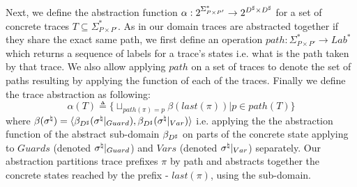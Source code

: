 Next, we define the abstraction function $\alpha : 2^{\Sigma^{*}_{P \times P'}} \rightarrow 2^{D^\sharp \times D^\sharp}$ for a set of concrete traces $T \subseteq \Sigma^{*}_{P \times P'}$. As in our domain traces are abstracted together if they share the exact same path, we first define an operation $path : \Sigma^{*}_{P \times P'} \rightarrow Lab^{*}$ which returns a sequence of labels for a trace's states i.e. what is the path taken by that trace. We also allow applying $path$ on a set of traces to denote the set of paths resulting by applying the function of each of the traces. Finally we define the trace abstraction as following:
\[
\alpha(T) \triangleq \{ \sqcup_{path(\pi)=p} \beta(last(\pi)) | p \in path(T) \}
\]
where $\beta(\sigma^\natural) = \langle \beta_{D^\sharp}(\sigma^\natural|_{Guard}), \beta_{D^\sharp}(\sigma^\natural|_{Var}) \rangle$  i.e. applying the the abstraction function of the abstract sub-domain $\beta_{D^\sharp}$ on parts of the concrete state applying to $Guards$ (denoted $\sigma^\natural|_{Guard}$) and $Vars$ (denoted $\sigma^\natural|_{Var}$) separately. Our abstraction partitions trace prefixes $\pi$ by path and abstracts together the concrete states reached by the prefix - $last(\pi)$, using the sub-domain.

